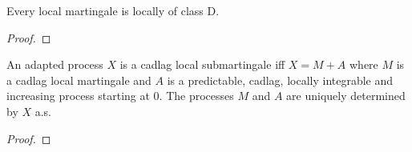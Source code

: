 \begin{lemma}\label{lem:IsLocalMartingale.local_doobMeyerClass}
Every local martingale is locally of class D.
\end{lemma}

\begin{proof}
\end{proof}


\begin{theorem}\label{thm:local_doobMeyer}
An adapted process $X$ is a cadlag local submartingale iff $X = M + A$ where $M$ is a cadlag local martingale and $A$ is a predictable, cadlag, locally integrable and increasing process starting at $0$.
The processes $M$ and $A$ are uniquely determined by $X$ a.s.
\end{theorem}

\begin{proof}

\end{proof}
